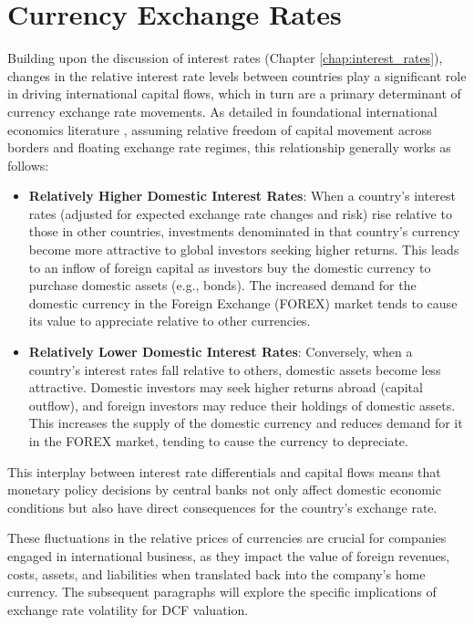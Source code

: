 \section{Currency Exchange Rates} \label{sec:exchange_rates}

Building upon the discussion of interest rates (Chapter \ref{chap:interest_rates}), changes in the relative interest rate levels between countries play a significant role in driving international capital flows, which in turn are a primary determinant of currency exchange rate movements. As detailed in foundational international economics literature \parencite{krugman2022international}, assuming relative freedom of capital movement across borders and floating exchange rate regimes, this relationship generally works as follows:

\begin{itemize}
    \item \textbf{Relatively Higher Domestic Interest Rates}: When a country's interest rates (adjusted for expected exchange rate changes and risk) rise relative to those in other countries, investments denominated in that country's currency become more attractive to global investors seeking higher returns. This leads to an inflow of foreign capital as investors buy the domestic currency to purchase domestic assets (e.g., bonds). The increased demand for the domestic currency in the Foreign Exchange (FOREX) market tends to cause its value to appreciate relative to other currencies.
    \item \textbf{Relatively Lower Domestic Interest Rates}: Conversely, when a country's interest rates fall relative to others, domestic assets become less attractive. Domestic investors may seek higher returns abroad (capital outflow), and foreign investors may reduce their holdings of domestic assets. This increases the supply of the domestic currency and reduces demand for it in the FOREX market, tending to cause the currency to depreciate.
\end{itemize}

This interplay between interest rate differentials and capital flows means that monetary policy decisions by central banks not only affect domestic economic conditions but also have direct consequences for the country's exchange rate.

These fluctuations in the relative prices of currencies are crucial for companies engaged in international business, as they impact the value of foreign revenues, costs, assets, and liabilities when translated back into the company's home currency. The subsequent paragraphs will explore the specific implications of exchange rate volatility for DCF valuation.


